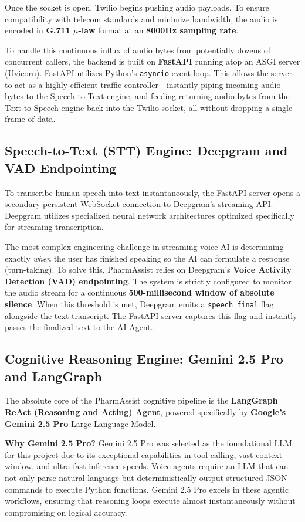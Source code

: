 \documentclass[conference]{IEEEtran}
\begin{document}
Once the socket is open, Twilio begins pushing audio payloads. To ensure compatibility with telecom standards and minimize bandwidth, the audio is encoded in \textbf{G.711 $\mu$-law} format at an \textbf{8000Hz sampling rate}. 

To handle this continuous influx of audio bytes from potentially dozens of concurrent callers, the backend is built on \textbf{FastAPI} running atop an ASGI server (Uvicorn). FastAPI utilizes Python's \texttt{asyncio} event loop. This allows the server to act as a highly efficient traffic controller---instantly piping incoming audio bytes to the Speech-to-Text engine, and feeding returning audio bytes from the Text-to-Speech engine back into the Twilio socket, all without dropping a single frame of data.

\subsection{Speech-to-Text (STT) Engine: Deepgram and VAD Endpointing}
To transcribe human speech into text instantaneously, the FastAPI server opens a secondary persistent WebSocket connection to Deepgram's streaming API. Deepgram utilizes specialized neural network architectures optimized specifically for streaming transcription.

The most complex engineering challenge in streaming voice AI is determining exactly \textit{when} the user has finished speaking so the AI can formulate a response (turn-taking). To solve this, PharmAssist relies on Deepgram's \textbf{Voice Activity Detection (VAD) endpointing}. The system is strictly configured to monitor the audio stream for a continuous \textbf{500-millisecond window of absolute silence}. When this threshold is met, Deepgram emits a \texttt{speech\_final} flag alongside the text transcript. The FastAPI server captures this flag and instantly passes the finalized text to the AI Agent.

\subsection{Cognitive Reasoning Engine: Gemini 2.5 Pro and LangGraph}
The absolute core of the PharmAssist cognitive pipeline is the \textbf{LangGraph ReAct (Reasoning and Acting) Agent}, powered specifically by \textbf{Google's Gemini 2.5 Pro} Large Language Model.

\textbf{Why Gemini 2.5 Pro?}
Gemini 2.5 Pro was selected as the foundational LLM for this project due to its exceptional capabilities in tool-calling, vast context window, and ultra-fast inference speeds. Voice agents require an LLM that can not only parse natural language but deterministically output structured JSON commands to execute Python functions. Gemini 2.5 Pro excels in these agentic workflows, ensuring that reasoning loops execute almost instantaneously without compromising on logical accuracy.
\end{document}
